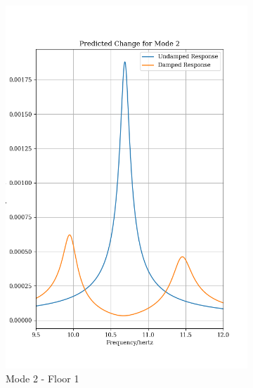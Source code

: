 \documentclass[8pt]{article}
\begin{document}
\begin{figure}[H]
{\begin{subfigure}[b]{.4\textwidth}
    \includegraphics[width=.95\textwidth]{m2.png}
    \vspace{-14pt}
    \caption{Mode 2 - Floor 1}
    \end{subfigure}%
    \begin{subfigure}[b]{.4\textwidth}
    \centering

\end{subfigure}}
\end{figure}
\end{document}
